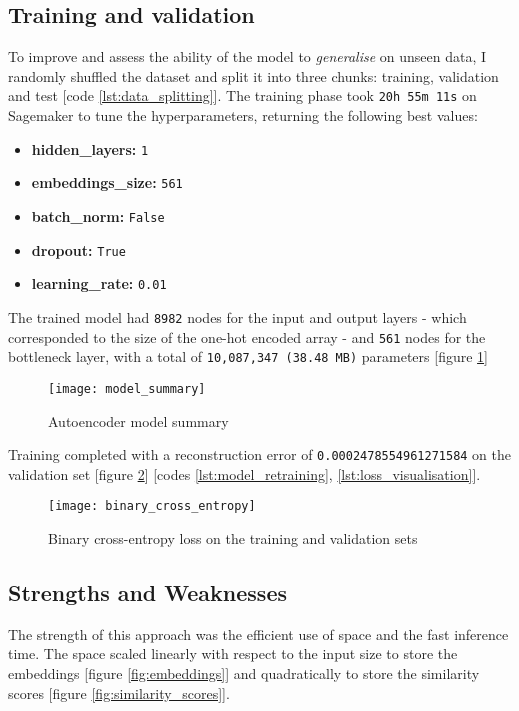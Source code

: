 \subsection{Training and validation}

To improve and assess the ability of the model to \textit{generalise} on unseen data, I randomly shuffled the dataset and split
it into three chunks: training, validation and test [code \ref{lst:data_splitting}].
The training phase took \verb|20h 55m 11s| on Sagemaker to tune the hyperparameters,
returning the following best values:

\begin{itemize}
  \item \textbf{hidden\_layers:} \verb|1|
  \item \textbf{embeddings\_size:} \verb|561|
  \item \textbf{batch\_norm:} \verb|False|
  \item \textbf{dropout:} \verb|True|
  \item \textbf{learning\_rate:} \verb|0.01|
\end{itemize}

The trained model had \verb|8982| nodes for the input and output layers - which corresponded to the size of
the one-hot encoded array - and \verb|561| nodes for the bottleneck layer, with a total of \verb|10,087,347 (38.48 MB)|
parameters [figure \ref{fig:model_summary}]

\begin{figure}[H]
  \centering
  \texttt{[image: model\_summary]}
  \caption{Autoencoder model summary}
  \label{fig:model_summary}
\end{figure}

Training completed with a reconstruction error of \verb|0.0002478554961271584| on the validation set
[figure \ref{fig:binary_cross_entropy}] [codes \ref{lst:model_retraining}, \ref{lst:loss_visualisation}].

\begin{figure}[H]
  \centering
  \texttt{[image: binary\_cross\_entropy]}
  \caption{Binary cross-entropy loss on the training and validation sets}
  \label{fig:binary_cross_entropy}
\end{figure}

\subsection{Strengths and Weaknesses}

The strength of this approach was the efficient use of space and the fast inference time.
The space scaled linearly with respect to the input size to store the embeddings [figure \ref{fig:embeddings}]
and quadratically to store the similarity scores [figure \ref{fig:similarity_scores}].

